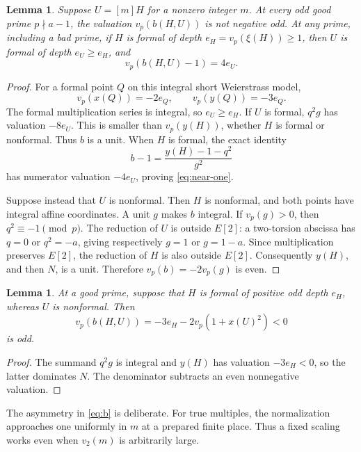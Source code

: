 \documentclass[11pt]{article}
\newtheorem{lemma}[theorem]{Lemma}
\begin{document}
\begin{lemma}\label{lem:multiple}
Suppose \(U=[m]H\) for a nonzero integer \(m\). At every odd good prime
\(p\nmid a-1\), the valuation \(v_p(b(H,U))\) is not negative odd.
At any prime, including a bad prime, if \(H\) is formal of depth
\(e_H=v_p(\xi(H))\ge1\), then \(U\) is formal of depth \(e_U\ge e_H\), and
\begin{equation}\label{eq:near-one}
                         v_p(b(H,U)-1)=4e_U.
\end{equation}
\end{lemma}
\begin{proof}
For a formal point \(Q\) on this integral short Weierstrass model,
\[
 v_p(x(Q))=-2e_Q,\qquad v_p(y(Q))=-3e_Q.
\]
The formal multiplication series is integral, so \(e_U\ge e_H\).
If \(U\) is formal, \(q^2g\) has valuation \(-8e_U\). This is smaller
than \(v_p(y(H))\), whether \(H\) is formal or nonformal. Thus \(b\)
is a unit. When \(H\) is formal, the exact identity
\[
                   b-1=\frac{y(H)-1-q^2}{g^2}
\]
has numerator valuation \(-4e_U\), proving \eqref{eq:near-one}.

Suppose instead that \(U\) is nonformal. Then \(H\) is nonformal, and
both points have integral affine coordinates. A unit \(g\) makes \(b\)
integral. If \(v_p(g)>0\), then \(q^2\equiv-1\pmod p\). The reduction
of \(U\) is outside \(E[2]\): a two-torsion abscissa has \(q=0\) or
\(q^2=-a\), giving respectively \(g=1\) or \(g=1-a\).
Since multiplication preserves \(E[2]\), the reduction of \(H\) is
also outside \(E[2]\). Consequently \(y(H)\), and then \(N\), is a
unit. Therefore \(v_p(b)=-2v_p(g)\) is even.
\end{proof}

\begin{lemma}\label{lem:reject}
At a good prime, suppose that \(H\) is formal of positive odd depth
\(e_H\), whereas \(U\) is nonformal. Then
\[
                v_p(b(H,U))=-3e_H-2v_p(1+x(U)^2)<0
\]
is odd.
\end{lemma}
\begin{proof}
The summand \(q^2g\) is integral and \(y(H)\) has valuation
\(-3e_H<0\), so the latter dominates \(N\). The denominator subtracts
an even nonnegative valuation.
\end{proof}

The asymmetry in \eqref{eq:b} is deliberate. For true multiples, the
normalization approaches one uniformly in \(m\) at a prepared finite
place. Thus a fixed scaling works even when \(v_2(m)\) is arbitrarily large.
\end{document}
